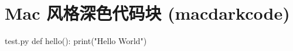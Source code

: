 \section{Mac 风格深色代码块 (macdarkcode)}

\begin{macdarkcode}[Python]{test.py}
def hello():
    print("Hello World")
\end{macdarkcode}